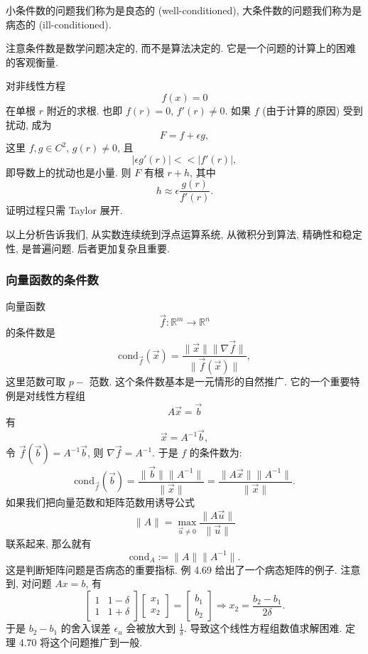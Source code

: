\documentclass[a4paper]{ctexart}
\begin{document}
{ 小条件数的问题我们称为是良态的 (well-conditioned),
大条件数的问题我们称为是病态的 (ill-conditioned).

注意条件数是数学问题决定的, 而不是算法决定的. 它是一个问题的计算上的困难的客观衡量.

 对非线性方程
$$
f(x) = 0
$$
在单根 $r$ 附近的求根. 也即 $f(r) = 0$, $f'(r) \neq 0$.
如果 $f$ (由于计算的原因) 受到扰动, 成为
$$
F = f + \epsilon g,
$$
这里 $f, g \in C^2$, $g(r) \neq 0$, 且
$$
|\epsilon g'(r)| << |f'(r)|,
$$
即导数上的扰动也是小量. 则 $F$ 有根 $r + h$, 其中
$$
h \approx \epsilon \frac{g(r)}{f'(r)}.
$$
证明过程只需 Taylor 展开.

以上分析告诉我们, 从实数连续统到浮点运算系统, 从微积分到算法, 精确性和稳定性,
是普遍问题. 后者更加复杂且重要.

\subsubsection{向量函数的条件数}

 向量函数
$$
\vec{f} : \mathbb{R}^m \to \mathbb{R}^n 
$$
的条件数是
$$
\mbox{cond}_{\vec{f}}(\vec{x})
= \frac{\|\vec{x}\|\|\nabla\vec{f}\|}{\|\vec{f}(\vec{x})\|},
$$
这里范数可取 $p-$ 范数. 这个条件数基本是一元情形的自然推广.
它的一个重要特例是对线性方程组
$$
A \vec{x} = \vec{b}
$$
有
$$
\vec{x} = A^{-1}\vec{b},
$$
令 $\vec{f}(\vec{b}) = A^{-1}\vec{b}$, 则 $\nabla \vec{f} = A^{-1}$.
于是 $f$ 的条件数为:
$$
\mbox{cond}_{\vec{f}}(\vec{b})
= \frac{\|\vec{b}\|\|A^{-1}\|}{\|\vec{x}\|}
= \frac{\|A\vec{x}\|\|A^{-1}\|}{\|\vec{x}\|}.
$$
如果我们把向量范数和矩阵范数用诱导公式
$$
\|A\| = \max_{\vec{u} \neq 0}\frac{\|A\vec{u}\|}{\|\vec{u}\|}
$$
联系起来, 那么就有
$$
\mbox{cond}_A := \|A\|\|A^{-1}\|.
$$
这是判断矩阵问题是否病态的重要指标. 例 4.69 给出了一个病态矩阵的例子. 注意到, 
对问题 $A x = b$, 有
$$
\left[
\begin{array}{cc}
  1 & 1 - \delta \\
  1 & 1 + \delta
\end{array}
\right]\left[\begin{array}{c}
  x_1 \\ x_2
\end{array}
\right] = \left[\begin{array}{c}
  b_1 \\ b_2
\end{array} \right] \Rightarrow x_2 = \frac{b_2 - b_1}{2 \delta}.
$$
于是 $b_2 - b_1$ 的舍入误差 $\epsilon_u$ 会被放大到 $\frac{1}{\delta}$. 
导致这个线性方程组数值求解困难. 定理 4.70 将这个问题推广到一般. 


}
\end{document}
